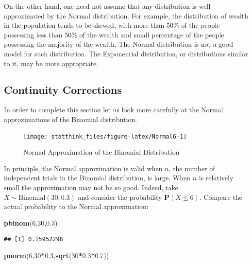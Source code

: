 \documentclass[]{krantz}
\makeatletter
\newenvironment{Shaded}{\begin{snugshade}}{\end{snugshade}}
\newcommand{\DecValTok}[1]{\textcolor[rgb]{0.00,0.00,0.81}{#1}}
\newcommand{\FloatTok}[1]{\textcolor[rgb]{0.00,0.00,0.81}{#1}}
\newcommand{\KeywordTok}[1]{\textcolor[rgb]{0.13,0.29,0.53}{\textbf{#1}}}
\newcommand{\NormalTok}[1]{#1}
\newcommand{\OperatorTok}[1]{\textcolor[rgb]{0.81,0.36,0.00}{\textbf{#1}}}
\newcommand{\Prob}{\mathbf{P}}
\newenvironment{kframe}{%
\medskip{}
\setlength{\fboxsep}{.8em}
 \def\at@end@of@kframe{}%
 \ifinner\ifhmode%
  \def\at@end@of@kframe{\end{minipage}}%
  \begin{minipage}{\columnwidth}%
 \fi\fi%
 \def\FrameCommand##1{\hskip\@totalleftmargin \hskip-\fboxsep
 \colorbox{shadecolor}{##1}\hskip-\fboxsep
     \hskip-\linewidth \hskip-\@totalleftmargin \hskip\columnwidth}%
 \MakeFramed {\advance\hsize-\width
   \@totalleftmargin\z@ \linewidth\hsize
   \@setminipage}}%
 {\par\unskip\endMakeFramed%
 \at@end@of@kframe}
\renewenvironment{Shaded}{\begin{kframe}}{\end{kframe}}
\theoremstyle{definition}
\theoremstyle{definition}
\theoremstyle{definition}
\theoremstyle{remark}
\makeatother
\begin{document}
On the other hand, one need not assume that any distribution is well
approximated by the Normal distribution. For example, the distribution
of wealth in the population tends to be skewed, with more than 50\% of
the people possessing less than 50\% of the wealth and small percentage
of the people possessing the majority of the wealth. The Normal
distribution is not a good model for such distribution. The Exponential
distribution, or distributions similar to it, may be more appropriate.

\hypertarget{continuity-corrections}{%
\subsection{Continuity Corrections}\label{continuity-corrections}}

In order to complete this section let us look more carefully at the
Normal approximations of the Binomial distribution.

\begin{figure}

{\centering \texttt{[image: statthink\_files/figure-latex/Normal6-1]} 

}

\caption{Normal Approximation of the Binomial Distribution}\label{fig:Normal6}
\end{figure}

In principle, the Normal approximation is valid when \(n\), the number of
independent trials in the Binomial distribution, is large. When \(n\) is
relatively small the approximation may not be so good. Indeed, take
\(X \sim \mathrm{Binomial}(30,0.3)\) and consider the probability
\(\Prob(X \leq 6)\). Compare the actual probability to the Normal
approximation:

\begin{Shaded}
\begin{Highlighting}[]
\KeywordTok{pbinom}\NormalTok{(}\DecValTok{6}\NormalTok{,}\DecValTok{30}\NormalTok{,}\FloatTok{0.3}\NormalTok{)}
\end{Highlighting}
\end{Shaded}

\begin{verbatim}
## [1] 0.15952298
\end{verbatim}

\begin{Shaded}
\begin{Highlighting}[]
\KeywordTok{pnorm}\NormalTok{(}\DecValTok{6}\NormalTok{,}\DecValTok{30}\OperatorTok{*}\FloatTok{0.3}\NormalTok{,}\KeywordTok{sqrt}\NormalTok{(}\DecValTok{30}\OperatorTok{*}\FloatTok{0.3}\OperatorTok{*}\FloatTok{0.7}\NormalTok{))}
\end{Highlighting}
\end{Shaded}
\end{document}
